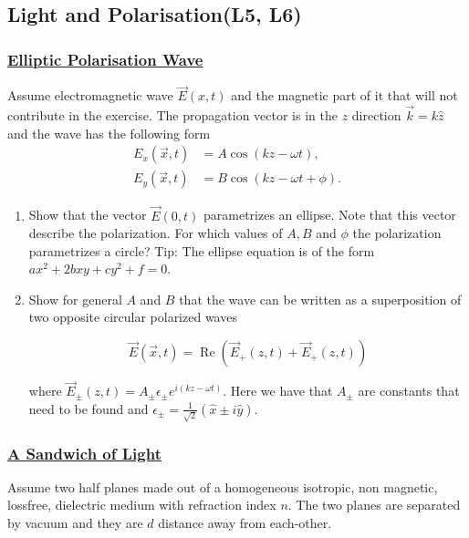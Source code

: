 \subsection{Light and Polarisation(\textbf{L5, L6})}

\subsubsection{\hyperref[EllipticPolarisationWave]{Elliptic Polarisation Wave}}

Assume electromagnetic wave $\vec{E}(x, t)$ and the magnetic part of it that will not contribute in the exercise. The propagation vector is in the $z$ direction $\vec{k}=k \hat{z}$ and the wave has the following form
\begin{subequations}
	\begin{align}
		E_{x}(\vec{x}, t)&=A \cos (k z-\omega t), \\
		E_{y}(\vec{x}, t)&=B \cos (k z-\omega t+\phi).
	\end{align}
\end{subequations}

\begin{enumerate}
	\item Show that the vector $\vec{E}(0, t)$ parametrizes an ellipse. Note that this vector describe the polarization. For which values of $A, B$ and $\phi$ the polarization parametrizes a circle? Tip: The ellipse equation is of the form $a x^{2}+2 b x y+c y^{2}+f=0$.
	\item Show for general $A$ and $B$ that the wave can be written as a superposition of two opposite circular polarized waves

	\begin{equation}
		\vec{E}(\vec{x}, t)=\operatorname{Re}\left(\vec{E}_{+}(z, t)+\vec{E}_{+}(z, t)\right)
	\end{equation}

	where $\vec{E}_{\pm}(z, t)=A_{\pm} \epsilon_{\pm} e^{i(k z-\omega t)}$. Here we have that $A_{\pm}$ are constants that need to be found and $\epsilon_{\pm}=\frac{1}{\sqrt{2}}(\hat{x} \pm i \hat{y}).$
\end{enumerate}

\subsubsection{\hyperref[ASandwichofLight]{A Sandwich of Light}}

Assume two half planes made out of a homogeneous isotropic, non magnetic, lossfree, dielectric medium with refraction index $n .$ The two planes are separated by vacuum and they are $d$ distance away from each-other.

